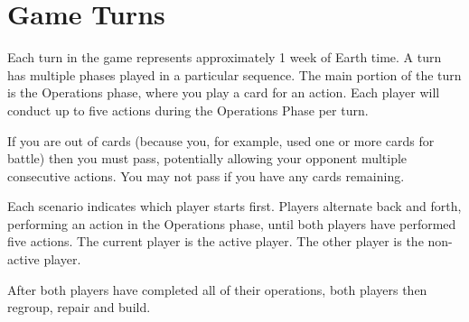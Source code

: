 \section{Game Turns}
Each turn in the game represents approximately 1 week of Earth time. A turn has multiple phases played in a particular sequence. The main portion of the turn is the Operations phase, where you play a card for an action. Each player will conduct up to five actions during the Operations Phase per turn.

If you are out of cards (because you, for example, used one or more cards for battle) then you must pass, potentially allowing your opponent multiple consecutive actions. You may not pass if you have any cards remaining.

Each scenario indicates which player starts first. Players alternate back and forth, performing an action in the Operations phase, until both players have performed five actions. The current player is the active player. The other player is the non-active player.

After both players have completed all of their operations, both players then regroup, repair and build.
